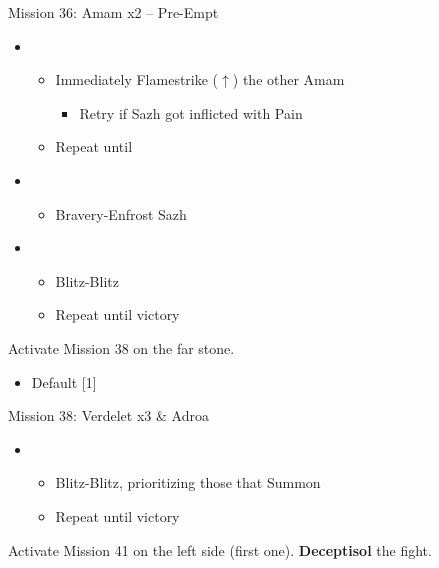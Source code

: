 \begin{battle}{Mission 36: Amam x2 -- Pre-Empt}
	\begin{itemize}
		\item \fourth
			\begin{itemize}
				\item Immediately Flamestrike ($\uparrow$) the other Amam
					\begin{itemize}
						\item Retry if Sazh got inflicted with Pain
					\end{itemize}
				\item Repeat until \stagger
			\end{itemize}
		\item \third
			\begin{itemize}
				\item Bravery-Enfrost Sazh
			\end{itemize}
		\item \fifth
			\begin{itemize}
				\item Blitz-Blitz
				\item Repeat until victory
			\end{itemize}																		
	\end{itemize}
\end{battle}

Activate Mission 38 on the far stone.
\vfill
\begin{menu}
	\begin{itemize}
	\paradigm
		\begin{itemize}
			\item Default [1]
		\end{itemize}
	\end{itemize}
\end{menu}

\begin{battle}{Mission 38: Verdelet x3 \& Adroa}
	\begin{itemize}
		\item \first
			\begin{itemize}
				\item Blitz-Blitz, prioritizing those that Summon
				\item Repeat until victory
			\end{itemize}																		
	\end{itemize}
\end{battle}

Activate Mission 41 on the left side (first one).
\textbf{Deceptisol} the fight.

